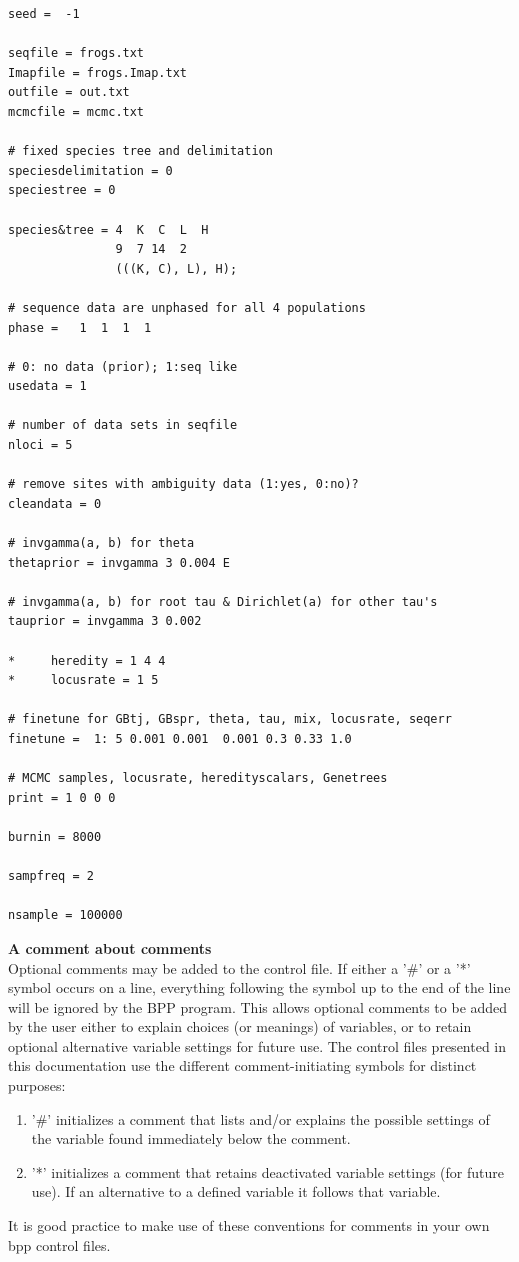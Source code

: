 \documentclass[a4paper]{book}
\numberwithin{equation}{section} \renewcommand{\baselinestretch}{0.55}
\begin{document}
\begin{verbatim}
seed =  -1

seqfile = frogs.txt
Imapfile = frogs.Imap.txt
outfile = out.txt
mcmcfile = mcmc.txt

# fixed species tree and delimitation
speciesdelimitation = 0 
speciestree = 0

species&tree = 4  K  C  L  H
               9  7 14  2
               (((K, C), L), H);

# sequence data are unphased for all 4 populations
phase =   1  1  1  1

# 0: no data (prior); 1:seq like
usedata = 1  

# number of data sets in seqfile
nloci = 5  

# remove sites with ambiguity data (1:yes, 0:no)?
cleandata = 0    

# invgamma(a, b) for theta
thetaprior = invgamma 3 0.004 E  

# invgamma(a, b) for root tau & Dirichlet(a) for other tau's
tauprior = invgamma 3 0.002    

*     heredity = 1 4 4
*     locusrate = 1 5

# finetune for GBtj, GBspr, theta, tau, mix, locusrate, seqerr
finetune =  1: 5 0.001 0.001  0.001 0.3 0.33 1.0  

# MCMC samples, locusrate, heredityscalars, Genetrees
print = 1 0 0 0   

burnin = 8000

sampfreq = 2

nsample = 100000
\end{verbatim}

\begin{mdframed}
  \textbf{A comment about comments} \\
  Optional comments may be added to the control file. If either a '\#'
  or a '*' symbol occurs on a line, everything following the symbol up
  to the end of the line will be ignored by the BPP program.  This
  allows optional comments to be added by the user either to explain
  choices (or meanings) of variables, or to retain optional
  alternative variable settings for future use. The control files
  presented in this documentation use the different comment-initiating
  symbols for distinct purposes:
  \begin{enumerate}
  \item '\#' initializes a comment that lists and/or explains the
    possible settings of the variable found immediately below the
    comment.
  \item '*' initializes a comment that retains deactivated variable
    settings (for future use).  If an alternative to a defined
    variable it follows that variable.
  \end{enumerate}
  It is good practice to make use of these conventions for comments in
  your own bpp control files.
\end{mdframed}
\end{document}
